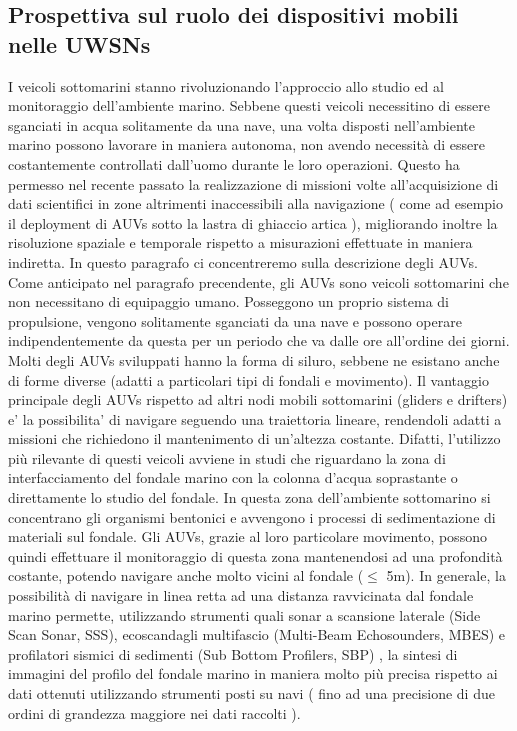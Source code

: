 \documentclass[Lau,binding=0.6cm]{sapthesis}
\begin{document}
\subsection{Prospettiva sul ruolo dei dispositivi mobili nelle UWSNs}
I veicoli sottomarini stanno rivoluzionando l'approccio allo studio ed al monitoraggio dell'ambiente marino. \newline Sebbene questi veicoli necessitino di essere sganciati in acqua solitamente da una nave, una volta disposti nell'ambiente marino possono lavorare in maniera autonoma, non avendo necessità di essere costantemente controllati dall'uomo durante le loro operazioni. \newline Questo ha permesso nel recente passato la realizzazione di missioni volte all'acquisizione di dati scientifici in zone altrimenti inaccessibili alla navigazione ( come ad esempio il deployment di AUVs sotto la lastra di ghiaccio artica \cite{wadhams}), migliorando inoltre la risoluzione spaziale e temporale rispetto a misurazioni effettuate in maniera indiretta.\newline
In questo paragrafo ci concentreremo sulla descrizione degli AUVs.
Come anticipato nel paragrafo precendente, gli AUVs sono veicoli sottomarini che non necessitano di equipaggio umano. Posseggono un proprio sistema di propulsione, vengono solitamente sganciati da una nave e possono operare indipendentemente da questa per un periodo che va dalle ore all'ordine dei giorni. Molti degli AUVs sviluppati hanno la forma di siluro, sebbene ne esistano anche di forme diverse (adatti a particolari tipi di fondali e movimento).\newline
Il vantaggio principale degli AUVs rispetto ad altri nodi mobili sottomarini (gliders e drifters) e' la possibilita' di navigare seguendo una traiettoria lineare, rendendoli adatti a missioni che richiedono il mantenimento di un'altezza costante.
Difatti, l'utilizzo più rilevante di questi veicoli  avviene in studi che riguardano la zona di interfacciamento del fondale marino con la colonna d'acqua soprastante o direttamente lo studio del fondale.  In questa zona dell'ambiente sottomarino si concentrano gli organismi bentonici e avvengono i processi di sedimentazione di materiali sul fondale. 
Gli AUVs, grazie al loro particolare movimento, possono quindi effettuare il monitoraggio di questa zona mantenendosi ad una profondità costante, potendo navigare anche molto vicini al fondale ($\leq$ 5m). \newline
In generale, la possibilità di navigare in linea retta ad una distanza ravvicinata dal fondale marino permette, utilizzando strumenti quali sonar a scansione laterale (Side Scan Sonar, SSS), ecoscandagli multifascio (Multi-Beam Echosounders, MBES) e profilatori sismici di sedimenti (Sub Bottom Profilers, SBP) , la sintesi di immagini del profilo del fondale marino in maniera molto più precisa rispetto ai dati ottenuti utilizzando strumenti posti su navi ( fino ad una precisione di due ordini di grandezza maggiore nei dati raccolti ). \newline 
\end{document}
